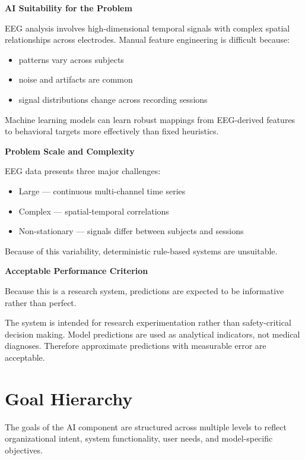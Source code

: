 \noindent\textbf{AI Suitability for the Problem}

EEG analysis involves high-dimensional temporal signals with complex spatial relationships across electrodes. Manual feature engineering is difficult because:

\begin{itemize}
    \item patterns vary across subjects
    \item noise and artifacts are common
    \item signal distributions change across recording sessions
\end{itemize}
Machine learning models can learn robust mappings from EEG-derived features to behavioral targets more effectively than fixed heuristics.

\vspace{0.5em}
\noindent\textbf{Problem Scale and Complexity}

EEG data presents three major challenges:
\begin{itemize}
    \item Large — continuous multi-channel time series
    \item Complex — spatial-temporal correlations
    \item Non-stationary — signals differ between subjects and sessions
\end{itemize}
Because of this variability, deterministic rule-based systems are unsuitable.

\vspace{0.5em}
\noindent\textbf{Acceptable Performance Criterion}

Because this is a research system, predictions are expected to be informative rather than perfect.

\vspace{0.5em}

The system is intended for research experimentation rather than safety-critical decision making.
Model predictions are used as analytical indicators, not medical diagnoses.
Therefore approximate predictions with measurable error are acceptable.

\FloatBarrier

\section{Goal Hierarchy}
\label{sec:goal-hierarchy}

The goals of the AI component are structured across multiple levels to reflect organizational intent, system functionality, user needs, and model-specific objectives.

